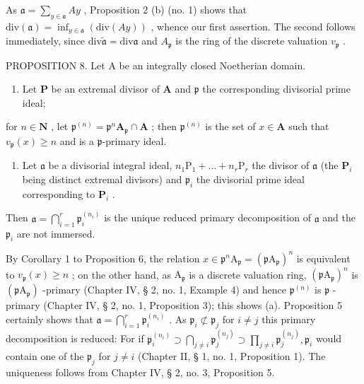 As \(\mathfrak{a} = \sum_{y \in \mathfrak{a}} Ay\) , Proposition 2 (b) (no. 1) shows that \(\text{div}(\mathfrak{a}) = \inf_{y \in \mathfrak{a}} (\text{div}(Ay))\) , whence our first assertion. The second follows immediately, since \(\text{div} \tilde{\mathfrak{a}} = \text{div} \mathfrak{a}\) and \(A_{\mathfrak{p}}\) is the ring of the discrete valuation \(v_{\mathfrak{p}}\) .

PROPOSITION 8. Let A be an integrally closed Noetherian domain.

\begin{enumerate}
\def\labelenumi{(\alph{enumi})}
\tightlist
\item
  Let \(\mathbf{P}\) be an extremal divisor of \(\mathbf{A}\) and \(\mathfrak{p}\) the corresponding divisorial prime ideal;
\end{enumerate}

for \(n \in \mathbf{N}\) , let \(\mathfrak{p}^{(n)} = \mathfrak{p}^n\mathbf{A}_{\mathfrak{p}} \cap \mathbf{A}\) ; then \(\mathfrak{p}^{(n)}\) is the set of \(x \in \mathbf{A}\) such that \(v_{\mathfrak{p}}(x) \geqslant n\) and is a \(\mathfrak{p}\)-primary ideal.

\begin{enumerate}
\def\labelenumi{(\alph{enumi})}
\setcounter{enumi}{1}
\tightlist
\item
  Let \(\mathfrak{a}\) be a divisorial integral ideal, \(n_1\mathrm{P}_1 + \dots + n_r\mathrm{P}_r\) the divisor of \(\mathfrak{a}\) (the \(\mathbf{P}_i\) being distinct extremal divisors) and \(\mathfrak{p}_i\) the divisorial prime ideal corresponding to \(\mathbf{P}_i\) .
\end{enumerate}

Then \(\mathfrak{a} = \bigcap_{i=1}^{r} \mathfrak{p}_i^{(n_i)}\) is the unique reduced primary decomposition of \(\mathfrak{a}\) and the \(\mathfrak{p}_i\) are not immersed.

By Corollary 1 to Proposition 6, the relation \(x \in \mathfrak{p}^n\mathrm{A}_{\mathfrak{p}} = (\mathfrak{p}\mathrm{A}_{\mathfrak{p}})^n\) is equivalent to \(v_{\mathfrak{p}}(x) \geqslant n\) ; on the other hand, as \(\mathrm{A}_{\mathfrak{p}}\) is a discrete valuation ring, \((\mathfrak{p}\mathrm{A}_{\mathfrak{p}})^n\) is \((\mathfrak{p}\mathrm{A}_{\mathfrak{p}})\) -primary (Chapter IV, § 2, no. 1, Example 4) and hence \(\mathfrak{p}^{(n)}\) is \(\mathfrak{p}\) -primary (Chapter IV, § 2, no. 1, Proposition 3); this shows (a). Proposition 5 certainly shows that \(\mathfrak{a} = \bigcap_{i=1}^{r} \mathfrak{p}_i^{(n_i)}\) . As \(\mathfrak{p}_i \not\subset \mathfrak{p}_j\) for \(i \neq j\) this primary decomposition is reduced: For if \(\mathfrak{p}_i^{(n_i)} \supset \bigcap_{j \neq i} \mathfrak{p}_j^{(n_j)} \supset \prod_{j \neq i} \mathfrak{p}_j^{(n_j)}, \mathfrak{p}_i\) would contain one of the \(\mathfrak{p}_j\) for \(j \neq i\) (Chapter II, § 1, no. 1, Proposition 1). The uniqueness follows from Chapter IV, § 2, no. 3, Proposition 5.

